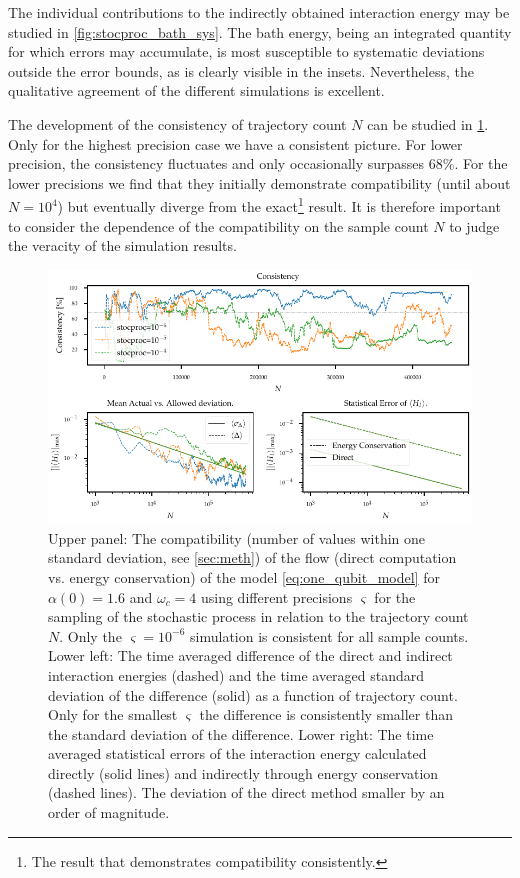 The individual contributions to the indirectly obtained interaction
energy may be studied in \cref{fig:stocproc_bath_sys}. The bath
energy, being an integrated quantity for which errors may accumulate,
is most susceptible to systematic deviations outside the error bounds,
as is clearly visible in the insets. Nevertheless, the qualitative
agreement of the different simulations is excellent.

The development of the consistency of trajectory count \(N\) can be
studied in \cref{fig:stocproc_consistency_dev}. Only for the highest
precision case we have a consistent picture. For lower precision, the
consistency fluctuates and only occasionally surpasses \(68\%\). For
the lower precisions we find that they initially demonstrate
compatibility (until about \(N=10^4\)) but eventually diverge from the
exact\footnote{The result that demonstrates compatibility
  consistently.} result. It is therefore important to consider the
dependence of the compatibility on the sample count \(N\) to judge the
veracity of the simulation results.
\begin{figure}[hp]
  \centering
  \includegraphics{figs/one_bath_syst/stocproc_systematics_consistency}
  \caption{\label{fig:stocproc_consistency_dev} Upper panel: The
    compatibility (number of values within one standard deviation, see
    \cref{sec:meth}) of the flow (direct computation vs. energy
    conservation) of the model \cref{eq:one_qubit_model} for
    \(α(0)=1.6\) and \(ω_c=4\) using different precisions
    \(\varsigma\) for the sampling of the stochastic process in
    relation to the trajectory count \(N\). Only the
    \(\varsigma=10^{-6}\) simulation is consistent for all sample
    counts. Lower left: The time averaged difference of the direct and
    indirect interaction energies (dashed) and the time averaged
    standard deviation of the difference (solid) as a function of
    trajectory count. Only for the smallest \(\varsigma\) the
    difference is consistently smaller than the standard deviation of
    the difference. Lower right: The time averaged statistical errors
    of the interaction energy calculated directly (solid lines) and
    indirectly through energy conservation (dashed lines). The
    deviation of the direct method smaller by an order of magnitude.}
\end{figure}


